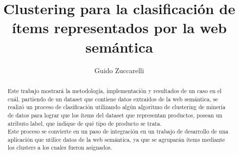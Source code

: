 \documentclass[a4paper,10pt]{article}
\title{Clustering para la clasificación de ítems representados por la web semántica}
\author{Guido Zuccarelli}
\begin{document}
\maketitle

\begin{abstract}
Este trabajo mostrará la metodología, implementación y resultados de un caso en el cuál, partiendo de un dataset que contiene datos 
extraídos de la web semántica, se realizó un proceso de clasificación utilizando algún algoritmo de clustering de minería de datos 
para lograr que los ítems del dataset que representan productos, posean un atributo label, que indique de qué tipo de producto se 
trata. \\
Este proceso se convierte en un paso de integración en un trabajo de desarrollo de una aplicación que utilice datos de la web semántica, 
ya que se agruparán ítems mediante los clusters a los cuales fueron asignados.
\end{abstract}
\newpage
\tableofcontents












\end{document}
